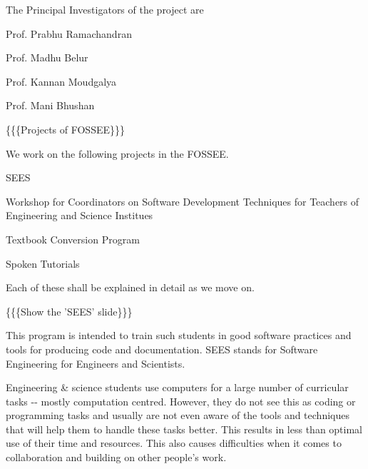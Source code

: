 \documentclass[a4paper,english]{article}
\begin{document}
The Principal Investigators of the project are
\begin{list}{.}
{
\setlength{\rightmargin}{\leftmargin}
}

\item Prof. Prabhu Ramachandran

\item Prof. Madhu Belur

\item Prof. Kannan Moudgalya

\item Prof. Mani Bhushan
\end{list}


\{\{\{Projects of FOSSEE\}\}\}


We work on the following projects in the FOSSEE.
\setcounter{listcnt0}{0}
\begin{list}{.}
{
\setlength{\rightmargin}{\leftmargin}
}

\item SEES

\item Workshop for Coordinators on Software Development Techniques for Teachers of Engineering and Science Institues

\item Textbook Conversion Program

\item Spoken Tutorials
\end{list}

Each of these shall be explained in detail as we move on.


\{\{\{Show the 'SEES' slide\}\}\}


This program is intended to train such students in good software practices and tools for producing code and documentation. SEES stands for Software Engineering for Engineers and Scientists.

Engineering \& science students use computers for a large number of curricular tasks -{}- mostly computation centred. However, they do not see this as coding or programming tasks and usually are not even aware of the tools and techniques that will help them to handle these tasks better. This results in less than optimal use of their time and resources. This also causes difficulties when it comes to collaboration and building on other people's work.
\end{document}
